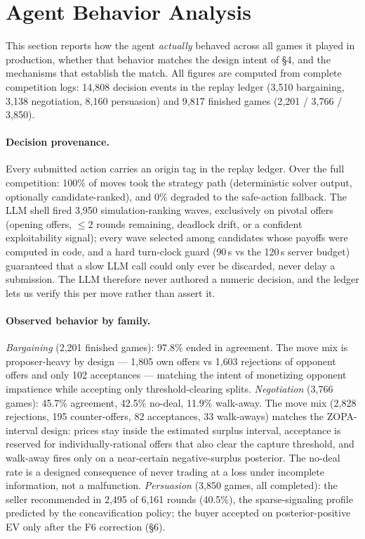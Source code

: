 \documentclass[11pt]{article}
\begin{document}
\section{Agent Behavior Analysis}
\label{sec:behavior}
This section reports how the agent {\em actually} behaved across all games it played in production, whether that behavior matches the design intent of \S4, and the mechanisms that establish the match. All figures are computed from complete competition logs: 14{,}808 decision events in the replay ledger (3{,}510 bargaining, 3{,}138 negotiation, 8{,}160 persuasion) and 9{,}817 finished games (2{,}201 / 3{,}766 / 3{,}850).

\paragraph{Decision provenance.}
Every submitted action carries an origin tag in the replay ledger. Over the full competition: 100\% of moves took the strategy path (deterministic solver output, optionally candidate-ranked), and 0\% degraded to the safe-action fallback. The LLM shell fired 3{,}950 simulation-ranking waves, exclusively on pivotal offers (opening offers, $\le 2$ rounds remaining, deadlock drift, or a confident exploitability signal); every wave selected among candidates whose payoffs were computed in code, and a hard turn-clock guard (90\,s vs the 120\,s server budget) guaranteed that a slow LLM call could only ever be discarded, never delay a submission. The LLM therefore never authored a numeric decision, and the ledger lets us verify this per move rather than assert it.

\paragraph{Observed behavior by family.}
\emph{Bargaining} (2{,}201 finished games): 97.8\% ended in agreement. The move mix is proposer-heavy by design --- 1{,}805 own offers vs 1{,}603 rejections of opponent offers and only 102 acceptances --- matching the intent of monetizing opponent impatience while accepting only threshold-clearing splits. \emph{Negotiation} (3{,}766 games): 45.7\% agreement, 42.5\% no-deal, 11.9\% walk-away. The move mix (2{,}828 rejections, 195 counter-offers, 82 acceptances, 33 walk-aways) matches the ZOPA-interval design: prices stay inside the estimated surplus interval, acceptance is reserved for individually-rational offers that also clear the capture threshold, and walk-away fires only on a near-certain negative-surplus posterior. The no-deal rate is a designed consequence of never trading at a loss under incomplete information, not a malfunction. \emph{Persuasion} (3{,}850 games, all completed): the seller recommended in 2{,}495 of 6{,}161 rounds (40.5\%), the sparse-signaling profile predicted by the concavification policy; the buyer accepted on posterior-positive EV only after the F6 correction (\S6).
\end{document}
